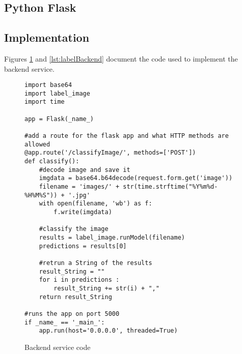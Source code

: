 \tocless\subsection{Python Flask}

\tocless\subsection{Implementation}
Figures \ref{lst:backendCode} and \ref{lst:labelBackend} document the code used to implement the backend service.

\begin{figure}[h]
\caption{Backend service code}
\label{lst:backendCode}
\begin{lstlisting}[style=Python]
import base64
import label_image
import time

app = Flask(_name_)

#add a route for the flask app and what HTTP methods are allowed
@app.route('/classifyImage/', methods=['POST'])
def classify():
    #decode image and save it
    imgdata = base64.b64decode(request.form.get('image'))
    filename = 'images/' + str(time.strftime("%Y%m%d-%H%M%S")) + '.jpg'
    with open(filename, 'wb') as f:
        f.write(imgdata)

    #classify the image
    results = label_image.runModel(filename)
    predictions = results[0]

    #retrun a String of the results
    result_String = ""
    for i in predictions :
        result_String += str(i) + ","
    return result_String

#runs the app on port 5000
if _name_ == '_main_':
    app.run(host='0.0.0.0', threaded=True)
\end{lstlisting}
\end{figure}

